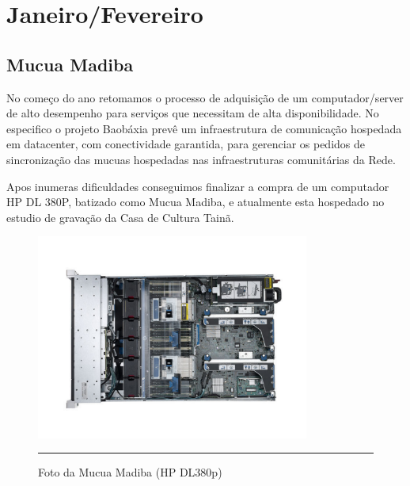 \documentclass[a4paper, 11pt, oneside]{Relatorio_sem_2}  %
\begin{document}


\part{Janeiro/Fevereiro} %

\chapter{Mucua Madiba}

No começo do ano retomamos o processo de adquisição de um
computador/server de alto desempenho para serviços que necessitam de
alta disponibilidade. No especifico o projeto Baobáxia prevê um
infraestrutura de comunicação hospedada em datacenter, com
conectividade garantida, para gerenciar os pedidos de sincronização das
mucuas hospedadas nas infraestruturas comunitárias da Rede.

Apos inumeras dificuldades conseguimos finalizar a compra de um
computador HP DL 380P, batizado como Mucua Madiba, e atualmente esta
hospedado no estudio de gravação da Casa de Cultura Tainã.

\begin{figure}[htbp]
  \centering
  \includegraphics[width=0.8\textwidth]{./Fig/DL380P_1.pdf}
  \rule{35em}{0.5pt}
  \caption[Foto da Mutua Madiba (HP DL380p)]{Foto da Mucua Madiba (HP DL380p)}
  \label{fig:MucuaMadiba1}
\end{figure}
\end{document}
